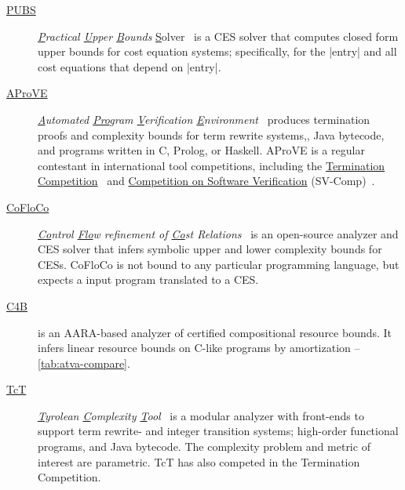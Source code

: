 \begin{description}

\item[\href{https://costa.fdi.ucm.es/~costa/pubs/pubs.php}{{PUBS}}]
      \emph{\underline{P}ractical \underline{U}pper \underline{B}ounds} \underline{S}olver~\cite{albert2010}
      is a CES solver that computes closed form upper bounds for cost equation systems;
      specifically, for the \pr|entry| and all cost equations that depend on \pr|entry|.

\item[\href{https://aprove.informatik.rwth-aachen.de}{{AProVE}}]
      \emph{\underline{A}utomated \underline{Pro}gram \underline{V}erification \underline{E}nvironment}~\cite{giesl2017}
      produces termination proofs and complexity bounds for
      term rewrite systems,,
      Java bytecode,
      and programs written in
      C,
      Prolog, or
      Haskell.
      AProVE is a regular contestant in international tool competitions, including the
      \href{https://termination-portal.org/wiki/Termination_Competition}{Termination Competition}~\cite{giesl2019}
      and \href{https://sv-comp.sosy-lab.org/}{Competition on Software Verification} (SV-Comp)~\cite{beyer2022}.

\item[\href{https://github.com/aeflores/CoFloCo}{{CoFloCo}}]
      \emph{\underline{Co}ntrol \underline{Flo}w refinement of \underline{Co}st Relations}~\cite{floresmontoya2014}
      is an open-source analyzer and CES solver that infers symbolic upper and lower complexity bounds for CESs.
      CoFloCo is not bound to any particular programming language, but expects a input program translated to a CES\@.

\item[\href{https://github.com/academic-archive/pldi15}{C4B}]\cite{carbonneaux2015}
      is an AARA-based analyzer of certified compositional resource bounds.
      It infers linear resource bounds on C-like programs by amortization -- \autoref{tab:atva-compare}.

\item[\href{http://cl-informatik.uibk.ac.at/software/tct/}{TcT}]
       \emph{\underline{T}yrolean \underline{C}omplexity \underline{T}ool}~\cite{avanzini2016}
       is a modular analyzer with front-ends to support term rewrite- and integer transition systems;
       high-order functional programs, and Java bytecode.
       The complexity problem and metric of interest are parametric.
       TcT has also competed in the Termination Competition.


\end{description}
